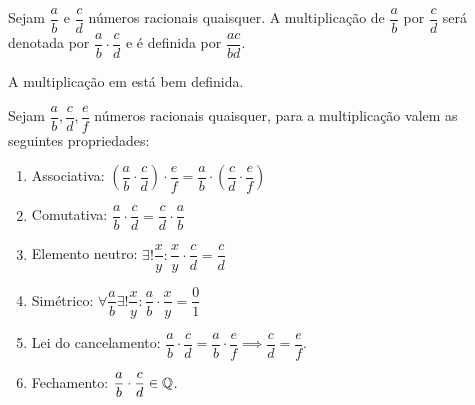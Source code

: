 \documentclass[../main.tex]{subfiles}
\begin{document}
\begin{defi}
    Sejam $\dfrac{a}{b}$ e $\dfrac{c}{d}$ números racionais quaisquer. A multiplicação de $\dfrac{a}{b}$ por $\dfrac{c}{d}$ será denotada por $\dfrac{a}{b} \cdot \dfrac{c}{d}$ e é definida por $\dfrac{ac}{bd}$.
\end{defi}
\begin{prop}
    A multiplicação em \Q está bem definida.
\end{prop}
\begin{prop}{Sejam $\dfrac{a}{b}, \dfrac{c}{d}, \dfrac{e}{f}$ números racionais quaisquer, para a multiplicação valem as seguintes propriedades:}
    \begin{enumerate}[label=(\roman*)]
        \item Associativa: 
            $\left( \dfrac{a}{b} \cdot \dfrac{c}{d}\right) \cdot \dfrac{e}{f} = 
            \dfrac{a}{b} \cdot \left(\dfrac{c}{d} \cdot \dfrac{e}{f}\right)$
        
        \item Comutativa: $\dfrac{a}{b} \cdot \dfrac{c}{d} = \dfrac{c}{d} \cdot \dfrac{a}{b}$
        
        \item Elemento neutro: $\exists! \dfrac{x}{y} : \dfrac{x}{y} \cdot \dfrac{c}{d} =     \dfrac{c}{d}$
        
        \item Simétrico: $\forall \dfrac{a}{b} \exists! \dfrac{x}{y} :  \dfrac{a}{b} \cdot \dfrac{x}{y} = \dfrac{0}{1}$
        
        \item Lei do cancelamento:
            $\dfrac{a}{b} \cdot \dfrac{c}{d} = \dfrac{a}{b} \cdot \dfrac{e}{f} \implies \dfrac{c}{d} = \dfrac{e}{f}$.
            
        \item Fechamento:
        $\dfrac{a}{b} \cdot \dfrac{c}{d} \in \mathbb{Q}$.
    \end{enumerate}
\end{prop}
\end{document}
